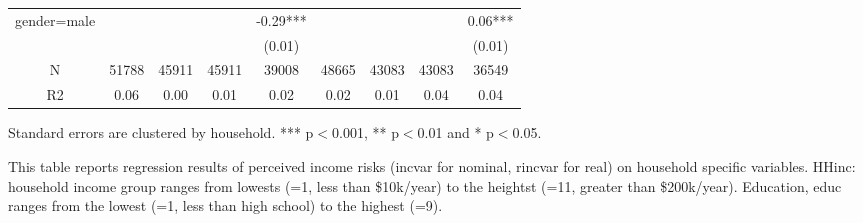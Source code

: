 \begin{table}[p]
\begin{adjustbox}{width=\textwidth}
\begin{threeparttable}
\begin{tabular}{ccccccccc}
gender=male      &           &           &            &    -0.29*** &           &            &             &      0.06*** \\
                 &           &           &            &      (0.01) &           &            &             &       (0.01) \\
N                &     51788 &     45911 &      45911 &       39008 &     48665 &      43083 &       43083 &        36549 \\
R2               &      0.06 &      0.00 &       0.01 &        0.02 &      0.02 &       0.01 &        0.04 &         0.04 \\
\bottomrule
\end{tabular}
\begin{tablenotes}\item Standard errors are clustered by household. *** p$<$0.001, ** p$<$0.01 and * p$<$0.05. 
\item This table reports regression results of perceived income risks (incvar for nominal, rincvar for real) on household specific variables. HHinc: household income group ranges from lowests (=1, less than \$10k/year) to the heightst (=11, greater than \$200k/year). Education, educ ranges from the lowest (=1, less than high school) to the highest (=9).
\end{tablenotes}
\end{threeparttable}
\end{adjustbox}
\end{table}